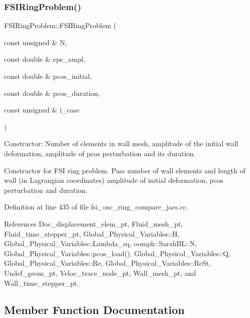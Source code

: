 \mbox{\label{classFSIRingProblem_a99a92bc3e2713063664277ce535c0af1}} 
\subsubsection{\texorpdfstring{F\+S\+I\+Ring\+Problem()}{FSIRingProblem()}\hspace{0.1cm}{\footnotesize\ttfamily [2/2]}}
{\footnotesize\ttfamily F\+S\+I\+Ring\+Problem\+::\+F\+S\+I\+Ring\+Problem (\begin{DoxyParamCaption}\item[{const unsigned \&}]{N,  }\item[{const double \&}]{eps\+\_\+ampl,  }\item[{const double \&}]{pcos\+\_\+initial,  }\item[{const double \&}]{pcos\+\_\+duration,  }\item[{const unsigned \&}]{i\+\_\+case }\end{DoxyParamCaption})}

Constructor\+: Number of elements in wall mesh, amplitude of the initial wall deformation, amplitude of pcos perturbation and its duration.

Constructor for F\+SI ring problem. Pass number of wall elements and length of wall (in Lagrangian coordinates) amplitude of initial deformation, pcos perturbation and duration. 

Definition at line 435 of file fsi\+\_\+osc\+\_\+ring\+\_\+compare\+\_\+jacs.\+cc.



References Doc\+\_\+displacement\+\_\+elem\+\_\+pt, Fluid\+\_\+mesh\+\_\+pt, Fluid\+\_\+time\+\_\+stepper\+\_\+pt, Global\+\_\+\+Physical\+\_\+\+Variables\+::H, Global\+\_\+\+Physical\+\_\+\+Variables\+::\+Lambda\+\_\+sq, oomph\+::\+Sarah\+B\+L\+::N, Global\+\_\+\+Physical\+\_\+\+Variables\+::pcos\+\_\+load(), Global\+\_\+\+Physical\+\_\+\+Variables\+::Q, Global\+\_\+\+Physical\+\_\+\+Variables\+::\+Re, Global\+\_\+\+Physical\+\_\+\+Variables\+::\+Re\+St, Undef\+\_\+geom\+\_\+pt, Veloc\+\_\+trace\+\_\+node\+\_\+pt, Wall\+\_\+mesh\+\_\+pt, and Wall\+\_\+time\+\_\+stepper\+\_\+pt.



\subsection{Member Function Documentation}
\mbox{\label{classFSIRingProblem_af4ffa3d628230ef064a84b7c6e6a5fb8}} 

